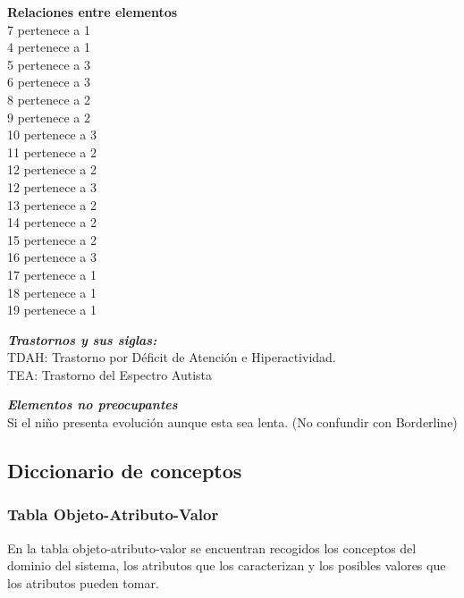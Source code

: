\documentclass[letterpaper,12pt]{article}
\begin{document}
\begin{flushleft}
\textbf{Relaciones entre elementos} \\
7 pertenece a 1\\
4 pertenece a 1\\
5 pertenece a 3\\
6 pertenece a 3\\
8 pertenece a 2\\
9 pertenece a 2\\
10 pertenece a 3\\
11 pertenece a 2\\
12 pertenece a 2\\
12 pertenece a 3\\
13 pertenece a 2\\
14 pertenece a 2\\
15 pertenece a 2\\
16 pertenece a 3\\
17 pertenece a 1\\
18 pertenece a 1\\
19 pertenece a 1\\


\end{flushleft}

\begin{flushleft}
\textbf{\textit{Trastornos y sus siglas:}}\\
TDAH: Trastorno por Déficit de Atención e Hiperactividad. \\
TEA: Trastorno del Espectro Autista \\
\end{flushleft}

\begin{flushleft}
\textbf{\textit{Elementos no preocupantes}} \\
Si el niño presenta evolución aunque esta sea lenta. (No confundir con
Borderline) \\
\end{flushleft}

\subsection{Diccionario de conceptos}
\subsubsection{Tabla Objeto-Atributo-Valor}
En la tabla objeto-atributo-valor se encuentran recogidos los conceptos
del dominio del sistema, los atributos que los caracterizan y los posibles valores que los atributos pueden tomar.
\end{document}

